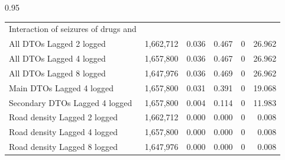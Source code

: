 \documentclass[12pt,letterpaper]{article}
\begin{document}
\begin{table}[h!]
\begin{spacing}{0.95}
\begin{tabular}{lrrrrr}
	Interaction of seizures of drugs and	&		&		&		&		&		 \\
	\hspace{1em} All DTOs Lagged 2 logged	&	 1,662,712 	&	0.036	&	0.467	&	0	&	26.962	 \\
	\hspace{1em} All DTOs Lagged 4 logged	&	 1,657,800 	&	0.036	&	0.467	&	0	&	26.962	 \\
	\hspace{1em} All DTOs Lagged 8 logged	&	 1,647,976 	&	0.036	&	0.469	&	0	&	26.962	 \\
	\hspace{1em} Main DTOs Lagged 4 logged	&	 1,657,800 	&	0.031	&	0.391	&	0	&	19.068	 \\
	\hspace{1em} Secondary DTOs Lagged 4 logged	&	 1,657,800 	&	0.004	&	0.114	&	0	&	11.983	 \\
	\hspace{1em} Road density Lagged 2 logged	&	 1,662,712 	&	0.000	&	0.000	&	0	&	0.008	 \\
	\hspace{1em} Road density Lagged 4 logged	&	 1,657,800 	&	0.000	&	0.000	&	0	&	0.008	 \\
	\hspace{1em} Road density Lagged 8 logged	&	 1,647,976 	&	0.000	&	0.000	&	0	&	0.008	 \\
												

\end{tabular}
\end{spacing}
\end{table}
\end{document}
